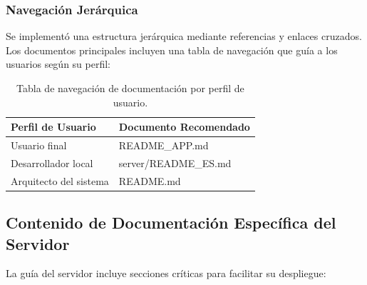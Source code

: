 \documentclass[12pt,a4paper]{article}
\begin{document}
\subsubsection{Navegación Jerárquica}

Se implementó una estructura jerárquica mediante referencias y enlaces cruzados. Los documentos principales incluyen una tabla de navegación que guía a los usuarios según su perfil:

\begin{table}[h]
    \centering
    \small
    \begin{tabular}{|l|l|}
    \hline
    \textbf{Perfil de Usuario} & \textbf{Documento Recomendado} \\
    \hline
    Usuario final & README\_APP.md \\
    Desarrollador local & server/README\_ES.md \\
    Arquitecto del sistema & README.md \\
    \hline
    \end{tabular}
    \caption{Tabla de navegación de documentación por perfil de usuario.}
    \label{tab:navegacion_docs}
\end{table}

\subsection{Contenido de Documentación Específica del Servidor}

La guía del servidor incluye secciones críticas para facilitar su despliegue:
\end{document}
